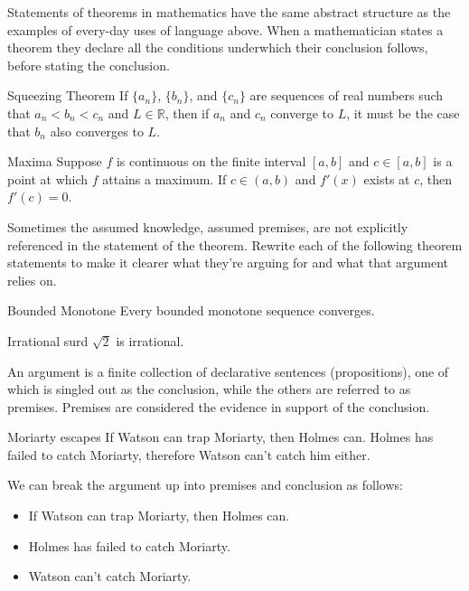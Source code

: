 \documentclass{book}
\begin{document}
Statements of theorems in mathematics have the same abstract structure as the examples of every-day uses of language above. When a mathematician states a theorem they declare all the conditions underwhich their conclusion follows, before stating the conclusion. 

\begin{eg}{Squeezing Theorem}
    If $\{a_{n}\}$, $\{b_{n}\}$, and $\{c_{n}\}$ are sequences of real numbers such that $a_{n} < b_{n} < c_{n}$ and $L \in \mathbb{R}$, then if $a_{n}$ and $c_{n}$ converge to $L$, it must be the case that $b_{n}$ also converges to $L$. 
\end{eg}

\begin{eg}{Maxima}
Suppose $f$ is continuous on the finite interval $[a,b]$ and $c \in [a,b]$ is a point at which $f$ attains a maximum. If $c \in (a,b)$ and $f'(x)$ exists at $c$, then $f'(c) = 0$. 
\end{eg}

Sometimes the assumed knowledge, assumed premises, are not explicitly referenced in the statement of the theorem. Rewrite each of the following theorem statements to make it clearer what they're arguing for and what that argument relies on. 

\begin{eg}{Bounded Monotone}
    Every bounded monotone sequence converges.
\end{eg}

\begin{eg}{Irrational surd}
    $\sqrt{2}$ is irrational.
\end{eg}




    An argument is a finite collection of declarative sentences (propositions), one of which is singled out as the conclusion, while the others are referred to as premises. Premises are considered the evidence in support of the conclusion.


\begin{eg}{Moriarty escapes}
    If Watson can trap Moriarty, then Holmes can. Holmes has failed to catch Moriarty, therefore Watson can't catch him either. 

    We can break the argument up into premises and conclusion as follows: 

    \begin{itemize}
        \item[P1:] If Watson can trap Moriarty, then Holmes can.
        \item[P2:] Holmes has failed to catch Moriarty.
        \item[C:] Watson can't catch Moriarty. 
    \end{itemize}
\end{eg}
\end{document}
